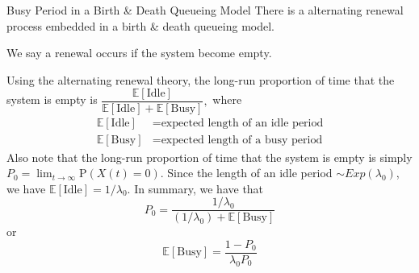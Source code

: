 \documentclass[letterpaper,handout]{beamer}
\def\p{\mathrm P}
\def\E{\mathbb E}
\begin{document}
\begin{frame}{Busy Period in a Birth \& Death Queueing Model}
There is a alternating renewal process embedded in a birth \& death queueing model.

We say a renewal occurs if the system become empty.%

Using the alternating renewal theory, the long-run proportion of time that the system is empty is
$\dfrac{\E[\text{Idle}]}{\E[\text{Idle}]+\E[\text{Busy}]},$
where
\begin{align*}
\E[\text{Idle}]&=\text{expected length of an idle period}\\
\E[\text{Busy}]&=\text{expected length of a busy period}
\end{align*}
Also note that the long-run proportion of time that the system is empty is simply $P_0=\lim_{t\to\infty}\p(X(t)=0)$.
Since the length of an idle period $\sim Exp(\lambda_0)$, we have $\E[\text{Idle}]=1/\lambda_0.$
In summary, we have that
$$
P_0=\frac{1/\lambda_0}{(1/\lambda_0)+\E[\text{Busy}]}
$$
or
$$
\E[\text{Busy}]=\frac{1-P_0}{\lambda_0 P_0}
$$
\end{frame}
\end{document}
